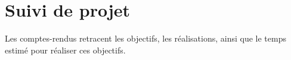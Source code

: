 \chapter{Suivi de projet}
Les comptes-rendus retracent les objectifs, les réalisations, ainsi que le temps estimé pour réaliser ces objectifs.






